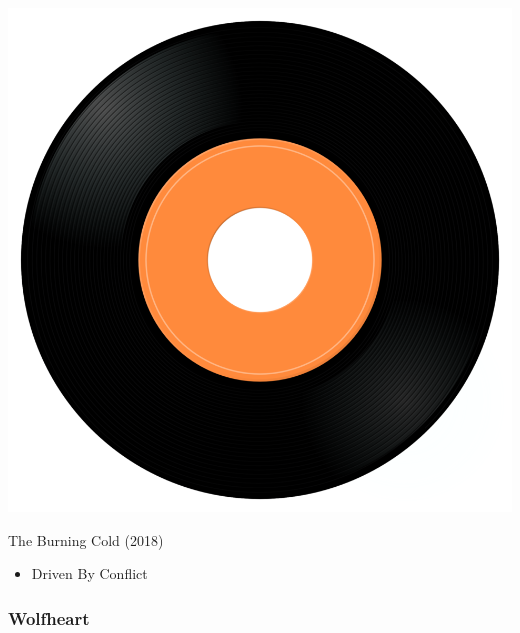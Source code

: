 \begin{minipage}[t]{0.25\textwidth}\vspace{0pt}
\captionsetup{type=figure}
\includegraphics[width=\textwidth]{Images/cover.png}
\caption*{The Burning Cold (2018)}
\end{minipage}
\begin{minipage}[t]{0.25\textwidth}\vspace{0pt}
\begin{itemize}[nosep,leftmargin=1em,labelwidth=*,align=left]
	\setlength{\itemsep}{0pt}
	\item Driven By Conflict
\end{itemize}
\end{minipage}

\subsubsection{Wolfheart}

